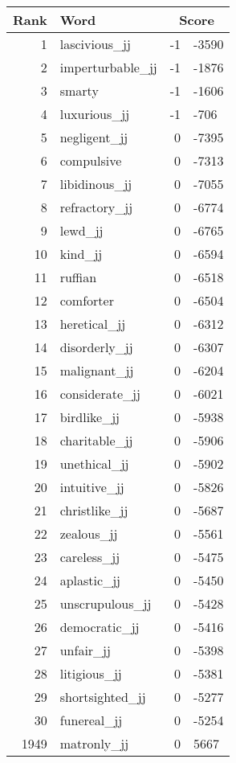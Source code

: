 \begin{longtable}[!htbp]{| rlr@{.}l |}
    \hline
    \textbf{Rank} & \textbf{Word} & \multicolumn{2}{c|}{\textbf{Score}} \\
    \hline
    \endhead
    1 & lascivious\_jj & -1 & -3590 \\
    2 & imperturbable\_jj & -1 & -1876 \\
    3 & smarty & -1 & -1606 \\
    4 & luxurious\_jj & -1 & -706 \\
    5 & negligent\_jj & 0 & -7395 \\
    6 & compulsive & 0 & -7313 \\
    7 & libidinous\_jj & 0 & -7055 \\
    8 & refractory\_jj & 0 & -6774 \\
    9 & lewd\_jj & 0 & -6765 \\
    10 & kind\_jj & 0 & -6594 \\
    11 & ruffian & 0 & -6518 \\
    12 & comforter & 0 & -6504 \\
    13 & heretical\_jj & 0 & -6312 \\
    14 & disorderly\_jj & 0 & -6307 \\
    15 & malignant\_jj & 0 & -6204 \\
    16 & considerate\_jj & 0 & -6021 \\
    17 & birdlike\_jj & 0 & -5938 \\
    18 & charitable\_jj & 0 & -5906 \\
    19 & unethical\_jj & 0 & -5902 \\
    20 & intuitive\_jj & 0 & -5826 \\
    21 & christlike\_jj & 0 & -5687 \\
    22 & zealous\_jj & 0 & -5561 \\
    23 & careless\_jj & 0 & -5475 \\
    24 & aplastic\_jj & 0 & -5450 \\
    25 & unscrupulous\_jj & 0 & -5428 \\
    26 & democratic\_jj & 0 & -5416 \\
    27 & unfair\_jj & 0 & -5398 \\
    28 & litigious\_jj & 0 & -5381 \\
    29 & shortsighted\_jj & 0 & -5277 \\
    30 & funereal\_jj & 0 & -5254 \\
    1949 & matronly\_jj & 0 & 5667 \\

\end{longtable}
